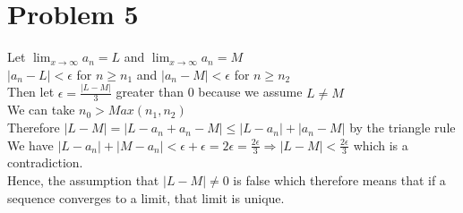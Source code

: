 \documentclass{article}
\begin{document}
\section*{Problem 5}
Let $\lim_{x \to \infty} a_n = L$ and $\lim_{x \to \infty} a_n = M$
\\$|a_n - L| < \epsilon$ for $n \geq n_1$ and $|a_n - M| < \epsilon$ for $n \geq n_2$
\\Then let $\epsilon = \frac{|L - M|}{3}$  greater than 0 because we assume $L \neq M$
\\We can take $n_0 > Max(n_1, n_2)$
\\Therefore $|L - M| = |L - a_n + a_n - M| \leq |L - a_n| + |a_n - M|$ by the triangle rule
\\We have $|L - a_n| + |M - a_n| < \epsilon + \epsilon = 2\epsilon = \frac{2\epsilon}{3} \Rightarrow |L-M| < \frac{2\epsilon}{3}$ which is a contradiction.
\\Hence, the assumption that $|L - M| \neq 0$ is false which therefore means that if a sequence converges to a limit, that limit is unique.
\end{document}
